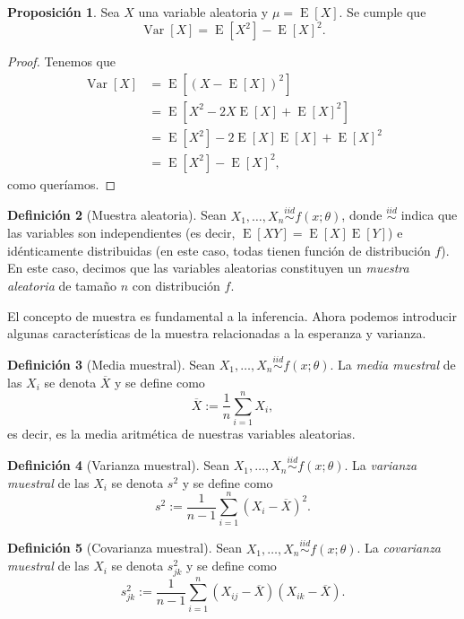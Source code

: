 \documentclass[11pt,letterpaper]{article}
\newcommand{\expected}{\ensuremath{\operatorname{E}}}
\newcommand{\variance}{\ensuremath{\operatorname{Var}}}
\theoremstyle{definition}
\newtheorem{definition}{Definición}[section]
\theoremstyle{theorem}
\newtheorem{proposition}[definition]{Proposición}
\theoremstyle{remark}
\begin{document}
	\begin{proposition}
		Sea \(X\) una variable aleatoria y \(\mu=\expected[X]\). Se cumple que \[\variance[X]=\expected\left[X^2\right]-\expected[X]^2.\]
	\end{proposition}
	\begin{proof}
		Tenemos que
		\begin{align*}
			\variance[X]&=\expected\left[(X-\expected[X])^2\right] \\
			&=\expected\left[X^2-2X\expected[X]+\expected[X]^2\right] \\
			&=\expected\left[X^2\right]-2\expected[X]\expected[X]+\expected[X]^2 \\
			&=\expected\left[X^2\right]-\expected[X]^2,
		\end{align*}
		como queríamos.
	\end{proof}
	\begin{definition}[Muestra aleatoria]
		Sean \(X_1,\dots,X_n\overset{iid}{\sim}f(x;\theta)\), donde \(\overset{iid}{\sim}\) indica que las variables son independientes (es decir, \(\expected[XY]=\expected[X]\expected[Y]\)) e idénticamente distribuidas (en este caso, todas tienen función de distribución \(f\)). En este caso, decimos que las variables aleatorias constituyen un \textit{muestra aleatoria} de tamaño \(n\) con distribución \(f\).
	\end{definition}
	El concepto de muestra es fundamental a la inferencia. Ahora podemos introducir algunas características de la muestra relacionadas a la esperanza y varianza.
	\begin{definition}[Media muestral]
		Sean \(X_1,\dots,X_n\overset{iid}{\sim}f(x;\theta)\). La \textit{media muestral} de las \(X_i\) se denota \(\overline{X}\) y se define como \[\overline{X}:=\frac{1}{n}\sum_{i=1}^{n}X_i,\] es decir, es la media aritmética de nuestras variables aleatorias.
	\end{definition}
	\begin{definition}[Varianza muestral]
		Sean \(X_1,\dots,X_n\overset{iid}{\sim}f(x;\theta)\). La \textit{varianza muestral} de las \(X_i\) se denota \(s^2\) y se define como \[s^2:=\frac{1}{n-1}\sum_{i=1}^{n}(X_i-\overline{X})^2.\]
	\end{definition}
	\begin{definition}[Covarianza muestral]
		Sean \(X_1,\dots,X_n\overset{iid}{\sim}f(x;\theta)\). La \textit{covarianza muestral} de las \(X_i\) se denota \(s_{jk}^2\) y se define como \[s_{jk}^2:=\frac{1}{n-1}\sum_{i=1}^{n}(X_{ij}-\overline{X})(X_{ik}-\overline {X}).\]
	\end{definition}
\end{document}
